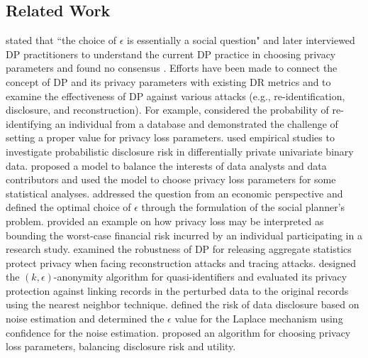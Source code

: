 \documentclass[10pt,journal,compsoc]{IEEEtran}
\begin{document}
\subsection{Related Work}\vspace{-3pt}
\citet{dwork2008differential} stated that ``the choice of $\epsilon$ is essentially a social question" and later interviewed   DP practitioners to understand the current DP practice in choosing privacy parameters and found no consensus \citet{dwork2019differential}.  Efforts have been made to connect the concept of DP and its privacy parameters with existing DR metrics and to examine the effectiveness of DP against various attacks (e.g., re-identification, disclosure, and reconstruction). For example, \citet{Clifton2011} considered the probability of re-identifying an individual from  a database and demonstrated the challenge of setting a proper value for privacy loss parameters. \citet{mcclure2012} used empirical studies to investigate probabilistic disclosure risk in differentially private univariate binary data. \citet{roth2014} proposed a  model to balance the interests of data analysts and data contributors and used the model to choose privacy loss parameters for some statistical analyses. \citet{abowd2015} addressed the question from an economic perspective 
and defined the optimal choice of $\epsilon$ through the formulation of the social planner’s problem.  \citet{nissim2017differential} provided an example on how privacy loss  may be interpreted as bounding the worst-case financial risk incurred by an individual participating in a research study. \citet{dwork2017exposed} examined the robustness of DP for releasing aggregate statistics protect privacy when facing reconstruction attacks and tracing attacks.  \citet{holohan2017k} designed the $(k,\epsilon)$-anonymity algorithm  for quasi-identifiers and evaluated its privacy protection against linking records in the perturbed data to the original records  using the nearest neighbor technique. \citet{chen2017evaluating} defined the risk of data disclosure based on noise estimation and determined the $\epsilon$ value for the Laplace mechanism using confidence for the noise estimation. \citet{chen2017data} proposed an algorithm for choosing privacy loss parameters, balancing disclosure risk and utility.


\vspace{-9pt}
\end{document}
